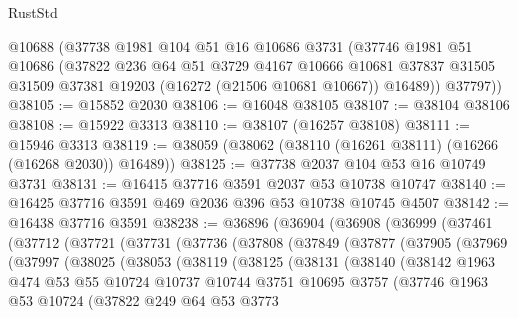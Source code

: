 \begin{lexlean}{RustStd}
\begin{coremodule}
      @10688
      (@37738
        @1981
        @104
        @51
        @16
        @10686
        @3731
        (@37746
          @1981
          @51
          @10686
          (@37822
            @236
            @64
            @51
            @3729
            @4167
            @10666
            @10681
            @37837
            @31505
            @31509
            @37381
            @19203
            (@16272 (@21506 @10681 @10667))
            @16489))
        @37797))
@38105 := @15852 @2030
@38106 := @16048 @38105
@38107 := @38104 @38106
@38108 := @15922 @3313
@38110 := @38107 (@16257 @38108)
@38111 := @15946 @3313
@38119 := @38059 (@38062 (@38110 (@16261 @38111) (@16266 (@16268 @2030)) @16489))
@38125 := @37738 @2037 @104 @53 @16 @10749 @3731
@38131 := @16415 @37716 @3591 @2037 @53 @10738 @10747
@38140 := @16425 @37716 @3591 @469 @2036 @396 @53 @10738 @10745 @4507
@38142 := @16438 @37716 @3591
@38238 := @36896
    (@36904
      (@36908
        (@36999
          (@37461
            (@37712
              (@37721
                (@37731
                  (@37736
                    (@37808
                      (@37849
                        (@37877
                          (@37905
                            (@37969
                              (@37997
                                (@38025
                                  (@38053
                                    (@38119
                                      (@38125
                                        (@38131
                                          (@38140
                                            (@38142
                                              @1963
                                              @474
                                              @53
                                              @55
                                              @10724
                                              @10737
                                              @10744
                                              @3751
                                              @10695
                                              @3757
                                              (@37746
                                                @1963
                                                @53
                                                @10724
                                                (@37822
                                                  @249
                                                  @64
                                                  @53
                                                  @3773

\end{coremodule}
\end{lexlean}
